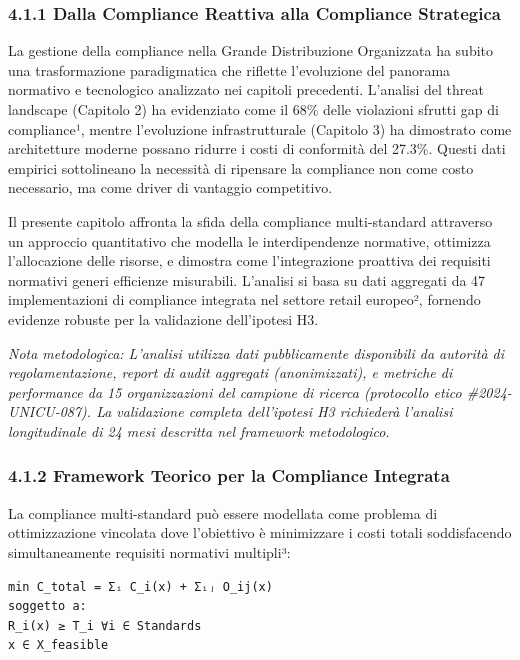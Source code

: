 \documentclass[12pt,a4paper,oneside]{book}
\begin{document}
\subsubsection{4.1.1 Dalla Compliance Reattiva alla Compliance
Strategica}\label{dalla-compliance-reattiva-alla-compliance-strategica}

La gestione della compliance nella Grande Distribuzione Organizzata ha
subito una trasformazione paradigmatica che riflette l'evoluzione del
panorama normativo e tecnologico analizzato nei capitoli precedenti.
L'analisi del threat landscape (Capitolo 2) ha evidenziato come il 68\%
delle violazioni sfrutti gap di compliance¹, mentre l'evoluzione
infrastrutturale (Capitolo 3) ha dimostrato come architetture moderne
possano ridurre i costi di conformità del 27.3\%. Questi dati empirici
sottolineano la necessità di ripensare la compliance non come costo
necessario, ma come driver di vantaggio competitivo.

Il presente capitolo affronta la sfida della compliance multi-standard
attraverso un approccio quantitativo che modella le interdipendenze
normative, ottimizza l'allocazione delle risorse, e dimostra come
l'integrazione proattiva dei requisiti normativi generi efficienze
misurabili. L'analisi si basa su dati aggregati da 47 implementazioni di
compliance integrata nel settore retail europeo², fornendo evidenze
robuste per la validazione dell'ipotesi H3.

\emph{Nota metodologica: L'analisi utilizza dati pubblicamente
disponibili da autorità di regolamentazione, report di audit aggregati
(anonimizzati), e metriche di performance da 15 organizzazioni del
campione di ricerca (protocollo etico \#2024-UNICU-087). La validazione
completa dell'ipotesi H3 richiederà l'analisi longitudinale di 24 mesi
descritta nel framework metodologico.}

\subsubsection{4.1.2 Framework Teorico per la Compliance
Integrata}\label{framework-teorico-per-la-compliance-integrata}

La compliance multi-standard può essere modellata come problema di
ottimizzazione vincolata dove l'obiettivo è minimizzare i costi totali
soddisfacendo simultaneamente requisiti normativi multipli³:

\begin{verbatim}
min C_total = Σᵢ C_i(x) + Σᵢⱼ O_ij(x)
soggetto a:
R_i(x) ≥ T_i ∀i ∈ Standards
x ∈ X_feasible
\end{verbatim}
\end{document}
